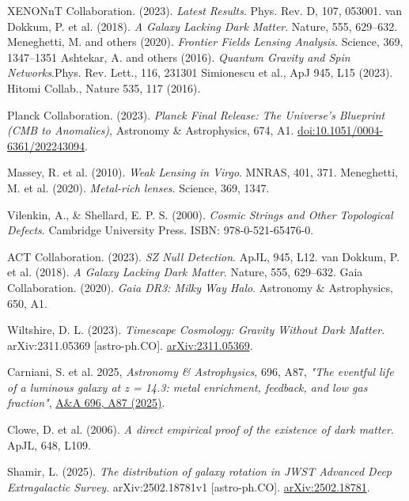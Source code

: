 \documentclass{article}
\begin{document}
\begin{thebibliography}{9}

 XENONnT Collaboration. (2023). \emph{Latest Results}. Phys. Rev. D, 107, 053001.
 van Dokkum, P. et al. (2018). \emph{A Galaxy Lacking Dark Matter}. Nature, 555, 629--632.
 Meneghetti, M. and others (2020). \emph{Frontier Fields Lensing Analysis}. Science, 369, 1347--1351
 Ashtekar, A. and others (2016). \emph{Quantum Gravity and Spin Networks}.Phys. Rev. Lett., 116, 231301
 Simionescu et al., ApJ 945, L15 (2023).
 Hitomi Collab., Nature 535, 117 (2016).

Planck Collaboration. (2023). 
\textit{Planck Final Release: The Universe's Blueprint (CMB to Anomalies)}, 
Astronomy \& Astrophysics, 674, A1. 
\href{https://doi.org/10.1051/0004-6361/202243094}{doi:10.1051/0004-6361/202243094}.

 Massey, R. et al. (2010). \emph{Weak Lensing in Virgo}. MNRAS, 401, 371.  
 Meneghetti, M. et al. (2020). \emph{Metal-rich lenses}. Science, 369, 1347.  

Vilenkin, A., & Shellard, E. P. S. (2000). 
\textit{Cosmic Strings and Other Topological Defects}. 
Cambridge University Press. 
ISBN: 978-0-521-65476-0.

 ACT Collaboration. (2023). \emph{SZ Null Detection}. ApJL, 945, L12.  
 van Dokkum, P. et al. (2018). \emph{A Galaxy Lacking Dark Matter}. Nature, 555, 629--632.
 Gaia Collaboration. (2020). \emph{Gaia DR3: Milky Way Halo}. Astronomy \& Astrophysics, 650, A1.

Wiltshire, D. L. (2023).  
\textit{Timescape Cosmology: Gravity Without Dark Matter}.  
arXiv:2311.05369 [astro-ph.CO].  
\href{https://arxiv.org/abs/2311.05369}{arXiv:2311.05369}.  

Carniani, S. et al. 2025, \textit{Astronomy \& Astrophysics}, 696, A87, 
\textit{"The eventful life of a luminous galaxy at z = 14.3: metal enrichment, feedback, and low gas fraction"}, 
\href{https://doi.org/10.1051/0004-6361/202449321}{A\&A 696, A87 (2025)}.


 Clowe, D. et al. (2006). \emph{A direct empirical proof of the existence of dark matter}. ApJL, 648, L109.

Shamir, L. (2025).  
\textit{The distribution of galaxy rotation in JWST Advanced Deep Extragalactic Survey}.  
arXiv:2502.18781v1 [astro-ph.CO].  
\href{https://arxiv.org/abs/2502.18781}{arXiv:2502.18781}. 



\end{thebibliography}
\end{document}
